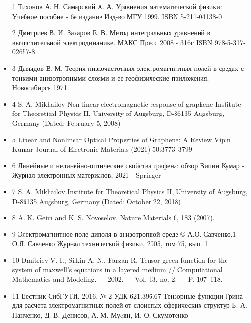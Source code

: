 	\begin{itemize}
		\item [1] Тихонов А. Н. Самарский А. А. Уравнения математической физики: Учебное пособие - 6е издание Изд-во МГУ 1999. ISBN 5-211-04138-0 
		
		\item [2] Дмитриев В. И. Захаров Е. В. Метод интегральных уравнений в вычислительной электродинамике. МАКС Пресс 2008 - 316с ISBN 978-5-317-02657-8
		
		\item 3 Давыдов В. М. Теория низкочастотных электромагнитных полей в средах с тонкими анизотропными слоями и ее геофизические приложения. Новосибирск 1971.
		
		\item 4 S. A. Mikhailov
		Non-linear electromagnetic response of graphene
		Institute for Theoretical Physics II, University of Augsburg, D-86135
		Augsburg, Germany (Dated: February 5, 2008)
		
		\item 5 Linear and Nonlinear Optical Properties of Graphene: A Review
		Vipin Kumar Journal of Electronic Materials (2021) 50:3773–3799
		
		\item 6 Линейные и нелинейно-оптические свойства графена: обзор
		Випин Кумар - Журнал электронных материалов, 2021 - Springer
		
		\item 7 S. A. Mikhailov
		Institute for Theoretical Physics II, University of Augsburg, D-86135 Augsburg, Germany
		(Dated: October 22, 2018)
		
		\item 8 A. K. Geim and K. S. Novoselov, Nature Materials 6, 183 (2007).
		
		\item 9 Электромагнитное поле диполя в анизотропной среде
		© А.О. Савченко,1 О.Я. Савченко Журнал технической физики, 2005, том 75, вып. 1
		
		\item  10 Dmitriev V. I., Silkin A. N., Farzan R. Tensor green function for the system of maxwell’s equations in a layered medium // Computational Mathematics and Modeling. — 2002. — Vol. 13, no. 2. — P. 107–118. 
		
		\item 11 Вестник СибГУТИ. 2016. № 2
		УДК 621.396.67
		Тензорные функции Грина
		для расчета электромагнитных полей 
		от слоистых сферических структур
		Б. А. Панченко, Д. В. Денисов, А. М. Муcин, И. О. Скумотенко
	\end{itemize}
	
	
	
